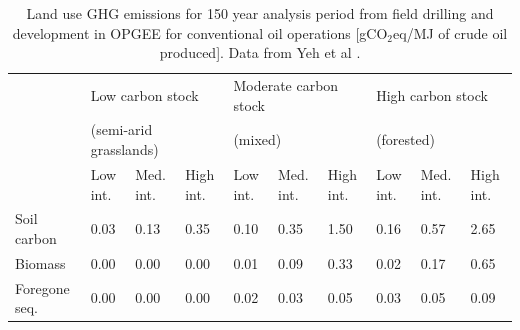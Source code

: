 \documentclass[11pt]{report}
\begin{document}
\begin{table}
\begin{scriptsize}
\caption{Land use GHG emissions for 150 year analysis period from field drilling and development in OPGEE for conventional oil operations [gCO$_2$eq/MJ of crude oil produced]. Data from Yeh et al \cite{Yeh2010}.}
\label{tab:default_land_use_emissions_150}
\begin{tabular}{p{}p{}p{}p{}p{}p{}p{}p{}p{}p{}}
\toprule
& \multicolumn{3}{p{0.25\columnwidth}}{Low carbon stock } & \multicolumn{3}{p{0.25\columnwidth}}{Moderate carbon stock } & \multicolumn{3}{p{0.25\columnwidth}}{High carbon stock}\\
& \multicolumn{3}{p{0.25\columnwidth}}{(semi-arid grasslands)} & \multicolumn{3}{p{0.25\columnwidth}}{(mixed)} & \multicolumn{3}{p{0.25\columnwidth}}{(forested)}\\
\cmidrule{2-4} \cmidrule{5-7} \cmidrule{8-10}
& Low int. & Med. int. & High int. & Low int. & Med. int. & High int. & Low int. & Med. int. & High int.\\
\midrule
Soil carbon & 0.03 & 0.13 & 0.35 & 0.10 & 0.35 & 1.50 & 0.16 & 0.57 & 2.65\\
Biomass & 0.00 & 0.00 & 0.00 & 0.01 & 0.09 & 0.33 & 0.02 & 0.17 & 0.65\\
Foregone seq.\ & 0.00 & 0.00 & 0.00 & 0.02 & 0.03 & 0.05 & 0.03 & 0.05 & 0.09\\
\bottomrule
\end{tabular}
\end{scriptsize}
\end{table}
\end{document}
